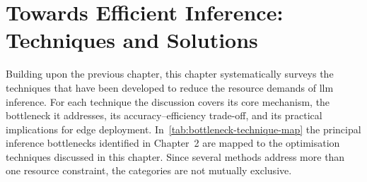 \chapter{Towards Efficient Inference: Techniques and Solutions}\label{chap:methods}

Building upon the previous chapter, this chapter systematically surveys the techniques that have been developed to reduce the resource demands of \ac{llm} inference. For each technique the discussion covers its core mechanism, the bottleneck it addresses, its accuracy--efficiency trade-off, and its practical implications for edge deployment. In~\ref{tab:bottleneck-technique-map} the principal inference bottlenecks identified in Chapter~2 are mapped to the optimisation techniques discussed in this chapter. Since several methods address more than one resource constraint, the categories are not mutually exclusive.

